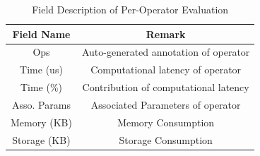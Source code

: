 \begin{table}[ht]
    \centering
    \caption{Field Description of Per-Operator Evaluation}
    \begin{tabular}{cc}
    \hline
Field Name   & Remark                                \\\hline
Ops          & Auto-generated annotation of operator \\
Time (us)     & Computational latency of operator     \\
Time (\%)     & Contribution of computational latency \\
Asso. Params & Associated Parameters of operator     \\
Memory (KB)  & Memory Consumption                    \\
Storage (KB) & Storage Consumption      \\\hline
    \end{tabular}
    \label{tab:output-fmt-per-ops}
\end{table}


